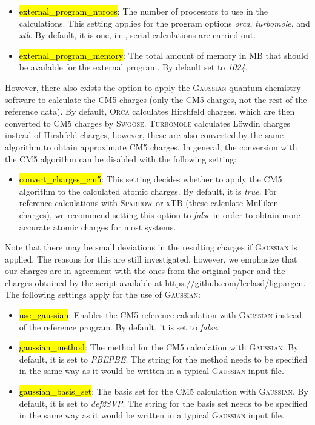 \documentclass[]{tufte-book}
\begin{document}
\begin{itemize}
\item \hl{external\_program\_nprocs}: The number of processors to use in the calculations. This setting applies for the program options \textit{orca}, \textit{turbomole}, and \textit{xtb}.
By default, it is one, i.e., serial calculations are carried out.
\item \hl{external\_program\_memory}: The total amount of memory in MB that should be available for the external program. By default set to \textit{1024}.
\end{itemize}

However, there also exists the option to apply the \textsc{Gaussian} quantum chemistry software\cite{gaussian09} to calculate the CM5 charges (only the CM5 charges, not the rest of the reference data). By default, \textsc{Orca} calculates Hirshfeld charges, which are then converted to CM5 charges by \textsc{Swoose}. \textsc{Turbomole} calculates L\"owdin charges instead of Hirshfeld charges, however, these are also converted by the same algorithm to obtain approximate CM5 charges. In general, the conversion with the CM5 algorithm can be disabled with the following setting:
\begin{itemize}
\item \hl{convert\_charges\_cm5}: This setting decides whether to apply the CM5 algorithm to the calculated atomic charges. By default, it is \textit{true}. For reference calculations with \textsc{Sparrow} or \textsc{xTB} (these calculate Mulliken charges), we recommend setting this option to \textit{false} in order to obtain more accurate atomic charges for most systems.
\end{itemize}

Note that there may be small deviations in the resulting charges if \textsc{Gaussian} is applied. The reasons for this are still investigated, however, we emphasize that our charges are in agreement with the ones from the original paper and the charges obtained by the script available at \href{https://github.com/leelasd/ligpargen}{https://github.com/leelasd/ligpargen}. 
The following settings apply for the use of \textsc{Gaussian}:
\begin{itemize}
\item \hl{use\_gaussian}: Enables the CM5 reference calculation with \textsc{Gaussian} instead of the reference program. By default, it is set to \textit{false}.
\item \hl{gaussian\_method}: The method for the CM5 calculation with \textsc{Gaussian}. By default, it is set to \textit{PBEPBE}. The string for the method needs to be specified in the same way as it would be written in a typical \textsc{Gaussian} input file.
\item \hl{gaussian\_basis\_set}: The basis set for the CM5 calculation with \textsc{Gaussian}. By default, it is set to \textit{def2SVP}. The string for the basis set needs to be specified in the same way as it would be written in a typical \textsc{Gaussian} input file.
\end{itemize}
\end{document}
